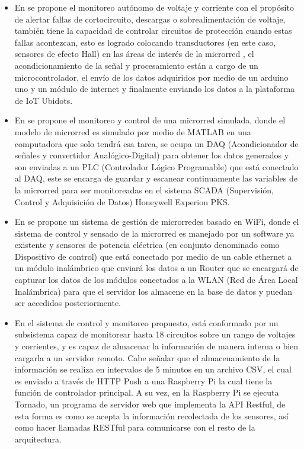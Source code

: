 \begin{itemize}
	\item En \citep{EstadoDelArte1} se propone el monitoreo autónomo de voltaje y corriente con el propósito de alertar fallas de cortocircuito, descargas o sobrealimentación de voltaje, también tiene la capacidad de controlar circuitos de protección cuando estas fallas acontezcan, esto es logrado colocando transductores (en este caso, sensores de efecto Hall) en las áreas de interés de la microrred , el acondicionamiento de la señal y procesamiento están a cargo de un microcontrolador, el envío de los datos adquiridos por medio de un arduino uno y un módulo de internet y finalmente enviando los datos a la plataforma de IoT Ubidots. 

    \item En \citep{EstadoDelArte2} se propone el monitoreo y control de una microrred simulada, donde el modelo de microrred es simulado por medio de MATLAB en una computadora que solo tendrá esa tarea, se ocupa un DAQ (Acondicionador de señales  y convertidor Analógico-Digital) para obtener los datos generados y son enviadas a un PLC (Controlador Lógico Programable) que está conectado al DAQ, este se encarga de guardar y escanear continuamente las variables de la microrred para ser monitoreadas en el sistema SCADA (Supervisión, Control y Adquisición de Datos) Honeywell Experion PKS.

    \item En \citep{EstadoDelArte3} se propone un sistema de gestión de microrredes basado en WiFi, donde el sistema de control y sensado de la microrred es manejado por un software ya existente y sensores de potencia eléctrica (en conjunto denominado como Dispositivo de control) que está conectado por medio de un cable ethernet a un módulo inalámbrico que enviará los datos a un Router que se encargará de capturar los datos de los módulos conectados a la WLAN (Red de Área Local Inalámbrica) para que el servidor los almacene en la base de datos y puedan ser accedidos posteriormente. 

    \item En \citep{EstadoDelArte4} el sistema de control y monitoreo propuesto, está conformado por un subsistema capaz de monitorear hasta 18 circuitos sobre un rango de voltajes y corrientes, y es capaz de almacenar la información de manera interna o bien cargarla a un servidor remoto. Cabe señalar que el almacenamiento de la información se realiza en intervalos de 5 minutos en un archivo CSV, el cual es enviado a través de HTTP Push a una Raspberry Pi la cual tiene la función de controlador principal. A su vez, en la Raspberry Pi se ejecuta Tornado, un programa de servidor web que implementa la API Restful, de esta forma es como se acepta la información recolectada de los sensores, así como hacer llamadas RESTful para comunicarse con el resto de la arquitectura.
\end{itemize}